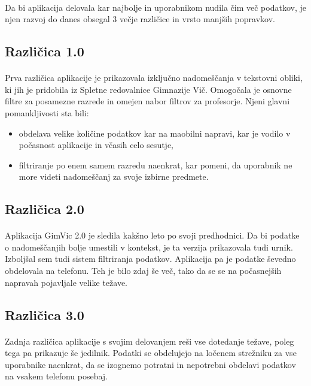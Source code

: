 \paragraph{}Da bi aplikacija delovala kar najbolje in uporabnikom nudila čim več podatkov, je njen razvoj do danes obsegal 3 večje različice in vrsto manjših popravkov.

\subsection{Različica 1.0}
\paragraph{}Prva različica aplikacije je prikazovala izključno nadomeščanja v tekstovni obliki, ki jih je pridobila iz Spletne redovalnice Gimnazije Vič. Omogočala je osnovne filtre za posamezne razrede in omejen nabor filtrov za profesorje. Njeni glavni pomankljivosti sta bili:
\begin{itemize}
  \setlength\itemsep{0em}
  \item obdelava velike količine podatkov kar na maobilni napravi, kar je vodilo v počasnost aplikacije in včasih celo sesutje,
  \item filtriranje po enem samem razredu naenkrat, kar pomeni, da uporabnik ne more videti nadomeščanj za svoje izbirne predmete.
\end{itemize}

\subsection{Različica 2.0}
\paragraph{} Aplikacija GimVic 2.0 je sledila kakšno leto po svoji predhodnici. Da bi podatke o nadomeščanjih bolje umestili v kontekst, je ta verzija prikazovala tudi urnik. Izboljšal sem tudi sistem filtriranja podatkov. Aplikacija pa je podatke ševedno obdelovala na telefonu. Teh je bilo zdaj še več, tako da se se na počasnejših napravah pojavljale velike težave.

\subsection{Različica 3.0}
\paragraph{} Zadnja različica aplikacije s svojim delovanjem reši vse dotedanje težave, poleg tega pa prikazuje še jedilnik. Podatki se obdelujejo na ločenem strežniku za vse uporabnike naenkrat, da se izognemo potratni in nepotrebni obdelavi podatkov na vsakem telefonu posebaj.
